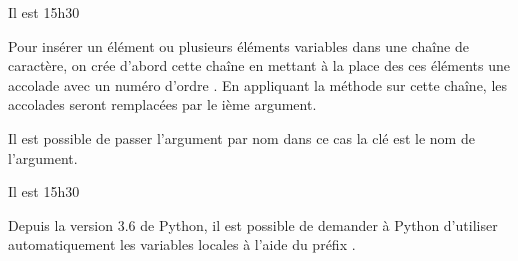 \documentclass[letterpaper,10pt,english]{sphinxhowto}
\begin{document}
\begin{sphinxVerbatim}[commandchars=\\\{\}]
  
  
 
\end{sphinxVerbatim}

\begin{sphinxVerbatim}[commandchars=\\\{\}]
\PYGZsq{}Il est 15h30\PYGZsq{}
\end{sphinxVerbatim}

\sphinxAtStartPar
Pour insérer un élément ou plusieurs éléments variables
dans une chaîne de caractère, on crée d’abord cette chaîne en mettant à la
place des ces éléments une accolade avec un numéro d’ordre . En appliquant la
méthode  sur cette chaîne, les accolades seront remplacées par
le ième argument.

\sphinxAtStartPar
Il est possible de passer l’argument par nom dans ce cas la clé est le nom de l’argument.

\begin{sphinxVerbatim}[commandchars=\\\{\}]
 
\end{sphinxVerbatim}

\begin{sphinxVerbatim}[commandchars=\\\{\}]
\PYGZsq{}Il est 15h30\PYGZsq{}
\end{sphinxVerbatim}

\sphinxAtStartPar
Depuis la version 3.6 de Python, il est possible de demander à Python d’utiliser automatiquement les variables locales à l’aide du préfix .

\begin{sphinxVerbatim}[commandchars=\\\{\}]
\end{sphinxVerbatim}
\end{document}
